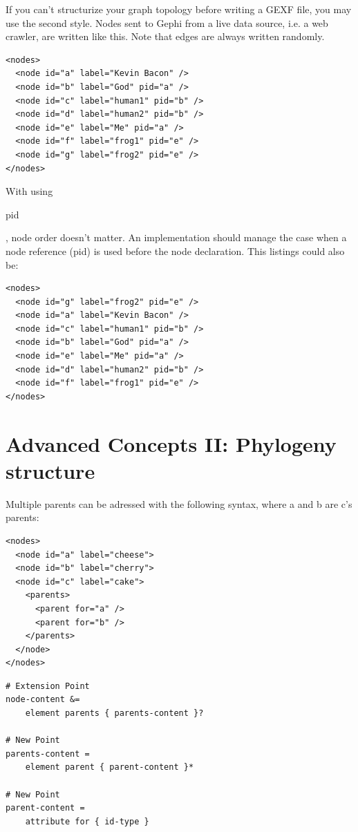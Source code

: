 \documentclass[a4paper,10pt]{article}
\begin{document}
If you can't structurize your graph topology before writing a GEXF file, you may use the second style. Nodes sent to Gephi from a live data source, i.e. a web crawler, are written like this. Note that edges are always written randomly.

\lstset{ style=gexf }
\begin{lstlisting}[caption={Second way},label=hierarchy2]
<nodes>
  <node id="a" label="Kevin Bacon" />
  <node id="b" label="God" pid="a" />
  <node id="c" label="human1" pid="b" />
  <node id="d" label="human2" pid="b" />
  <node id="e" label="Me" pid="a" />
  <node id="f" label="frog1" pid="e" />
  <node id="g" label="frog2" pid="e" />
</nodes>
\end{lstlisting}

With using \begin{footnotesize}pid\end{footnotesize}, node order doesn't matter. An implementation should manage the case when a node reference (pid) is used before the node declaration. This listings could also be:

\lstset{ style=gexf }
\begin{lstlisting}[caption={Second way randomized},label=hierarchy22]
<nodes>
  <node id="g" label="frog2" pid="e" />
  <node id="a" label="Kevin Bacon" />
  <node id="c" label="human1" pid="b" />
  <node id="b" label="God" pid="a" />
  <node id="e" label="Me" pid="a" />
  <node id="d" label="human2" pid="b" />
  <node id="f" label="frog1" pid="e" />
</nodes>
\end{lstlisting}


\section{Advanced Concepts II: Phylogeny structure} \label{hierarchy}

Multiple parents can be adressed with the following syntax, where a and b are c's parents:
\lstset{ style=gexf }
\begin{lstlisting}[caption={Multiple parents},label=phylogeny1]
<nodes>
  <node id="a" label="cheese">
  <node id="b" label="cherry">
  <node id="c" label="cake">
    <parents>
      <parent for="a" />
      <parent for="b" />
    </parents>
  </node>
</nodes>
\end{lstlisting}

\lstset{ style=rnc }
\begin{lstlisting}[caption={Phylogeny Specification},label=phylogenyRNC]
# Extension Point
node-content &=
    element parents { parents-content }?

# New Point
parents-content =
    element parent { parent-content }*

# New Point
parent-content =
    attribute for { id-type }
\end{lstlisting}
\end{document}
